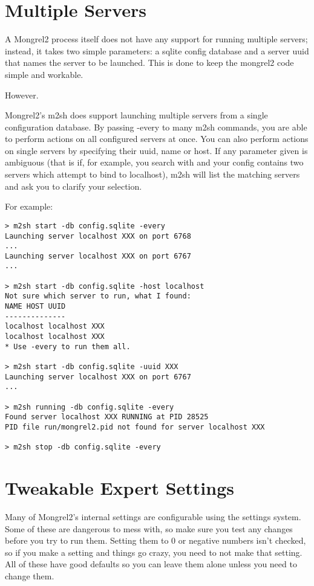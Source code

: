 \section{Multiple Servers}

A Mongrel2 process itself does not have any support for running multiple servers;
instead, it takes two simple parameters: a sqlite config database and a server uuid
that names the server to be launched. This is done to keep the mongrel2 code simple
and workable.

However.

Mongrel2's m2sh does support launching multiple servers from a single configuration
database. By passing -every to many m2sh commands, you are able to perform actions
on all configured servers at once. You can also perform actions on single servers
by specifying their uuid, name or host. If any parameter given is ambiguous (that
is if, for example, you search with  and your config contains
two servers which attempt to bind to localhost), m2sh will list the matching servers
and ask you to clarify your selection.

For example:
\begin{lstlisting}
> m2sh start -db config.sqlite -every
Launching server localhost XXX on port 6768
...
Launching server localhost XXX on port 6767
...

> m2sh start -db config.sqlite -host localhost
Not sure which server to run, what I found:
NAME HOST UUID
--------------
localhost localhost XXX
localhost localhost XXX
* Use -every to run them all.

> m2sh start -db config.sqlite -uuid XXX
Launching server localhost XXX on port 6767
...

> m2sh running -db config.sqlite -every
Found server localhost XXX RUNNING at PID 28525
PID file run/mongrel2.pid not found for server localhost XXX

> m2sh stop -db config.sqlite -every
\end{lstlisting}



\section{Tweakable Expert Settings}

Many of Mongrel2's internal settings are configurable using the settings system.
Some of these are dangerous to mess with, so make sure you test any changes before
you try to run them.  Setting them to 0 or negative numbers isn't checked, so if
you make a setting and things go crazy, you need to not make that setting.  All
of these have good defaults so you can leave them alone unless you need to change
them.

